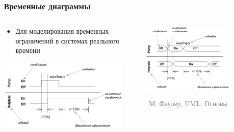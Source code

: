 \documentclass[xetex,mathserif,serif]{beamer}
\newcommand{\attribution}[1] {
	\vspace{-5mm}\begin{flushright}\begin{scriptsize}\textcolor{gray}{\textcopyright\, #1}\end{scriptsize}\end{flushright}
}
\begin{document}
	\begin{frame}
		\frametitle{Временные диаграммы}
		\begin{columns}
			\begin{column}{0.5\textwidth}
				\begin{itemize}
					\item Для моделирования временных ограничений в системах реального времени
				\end{itemize}
				\vspace{3mm}
				\begin{center}
					\includegraphics[width=0.9\textwidth]{timingDiagrams.png}
				\end{center}
			\end{column}
			\begin{column}{0.5\textwidth}
				\begin{center}
					\includegraphics[width=0.8\textwidth]{timingDiagramsAlternate.png}
					\attribution{М. Фаулер, UML. Основы}
				\end{center}
			\end{column}
		\end{columns}
	\end{frame}
\end{document}
